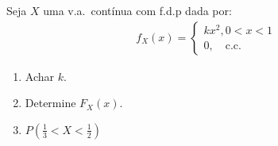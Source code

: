        \begin{example}
         Seja $X$ uma v.a.\ contínua com f.d.p dada por:
         \begin{align*}
           f_{X}(x) = 
           \begin{cases} 
             k x^2, 0 < x < 1 \\
             0, \quad \text{c.c.\ }
           \end{cases}
         \end{align*}
         \begin{enumerate}[label=(\alph*)]
           \item Achar $k$.
           \item Determine ${F}_{X} (x)$.
           \item $P (\frac{1}{3} < X < \frac{1}{2})$
         \end{enumerate} 


\end{example}
